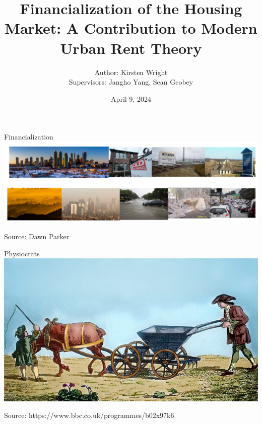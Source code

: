 \documentclass[notes=show]{beamer} %
\title{ Financialization of the Housing Market: A Contribution to Modern Urban Rent Theory}
\author{
  Author: Kirsten Wright \\
  Supervisors: Jangho Yang, Sean Geobey
}
\institute{SYDE Graduate Seminar \\[1ex] University of Waterloo}
\date{April 9, 2024}
\begin{document}

{
    \maketitle   
}



\begin{frame}{Financialization}
    \centering
    \includegraphics[scale=0.167]{fig/example_figures/pictures-ex-1.png}
    \vspace{-2.5em} %
    \begin{flushright}
        \tiny{Source: Dawn Parker}
    \end{flushright}
\end{frame}


\begin{frame}
\begin{figure}[!ht]
\centering
\resizebox{0.85\textwidth}{!}{}
\label{fig-fields}
\end{figure}
\end{frame}



\begin{frame}{Physiocrats}
    \centering
    \includegraphics[scale=0.6]{fig/carter_illustration.jpg}
    \vspace{-1.5em} %
    \begin{flushright}
        \tiny{Source: https://www.bbc.co.uk/programmes/b02x97k6} %
    \end{flushright}
\end{frame}
\end{document}
